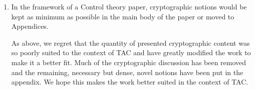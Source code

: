 \documentclass[a4paper]{scrartcl}
\newenvironment{rebuttal}{\begin{enumerate}[label={\color{grey}\thesection.\arabic{enumi}},leftmargin=0pt,ref=\thesection.\arabic{enumi}]}{\end{enumerate}}
\newcommand{\reviewtext}[1]{{\color{nblue} #1}}
\begin{document}
\begin{rebuttal}
We understand that the state of the initial submission was not as well suited to the TAC journal as could be desired and thank the reviewer for pointing this out. Existing literature published at TAC and concerning cryptographic constructs (for example, ``Cloud-based quadratic optimization with partially homomorphic encryption'' by Andreea Alexandru et al.), has been used as reference during our revision. For the resubmission, we have greatly reduced the cryptographic components of the work and stated our contribution and its novelty more clearly to clarify the suitability of the proposed estimation method to the TAC journal. We will additionally consider some of the heavier cryptographic computations presented for an alternative submission elsewhere.

\item \reviewtext{In the framework of a Control theory paper, cryptographic notions would be kept as minimum as possible in the main body of the paper or moved to Appendices.}

As above, we regret that the quantity of presented cryptographic content was so poorly suited to the context of TAC and have greatly modified the work to make it a better fit. Much of the cryptographic discussion has been removed and the remaining, necessary but dense, novel notions have been put in the appendix. We hope this makes the work better suited in the context of TAC.

\end{rebuttal}

\end{document}
